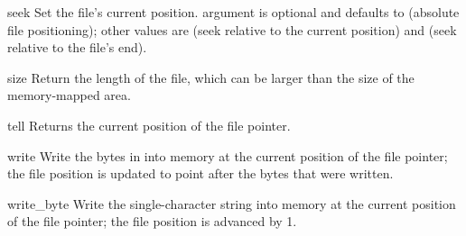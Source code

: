 \begin{methoddesc}{seek}{ }
  Set the file's current position.
   argument is optional and defaults to 
  (absolute file positioning); other values are  (seek
  relative to the current position) and  (seek relative to the
  file's end).  
\end{methoddesc}

\begin{methoddesc}{size}{}
Return the length of the file, which can be larger than the size
of the memory-mapped area. 
\end{methoddesc}

\begin{methoddesc}{tell}{}
Returns the current position of the file pointer.
\end{methoddesc}

\begin{methoddesc}{write}{}
Write the bytes in  into memory at the current position of
the file pointer; the file position is updated to point after the
bytes that were written. 
\end{methoddesc}

\begin{methoddesc}{write_byte}{}
Write the single-character string  into memory at the current position of
the file pointer; the file position is advanced by 1.
\end{methoddesc}


